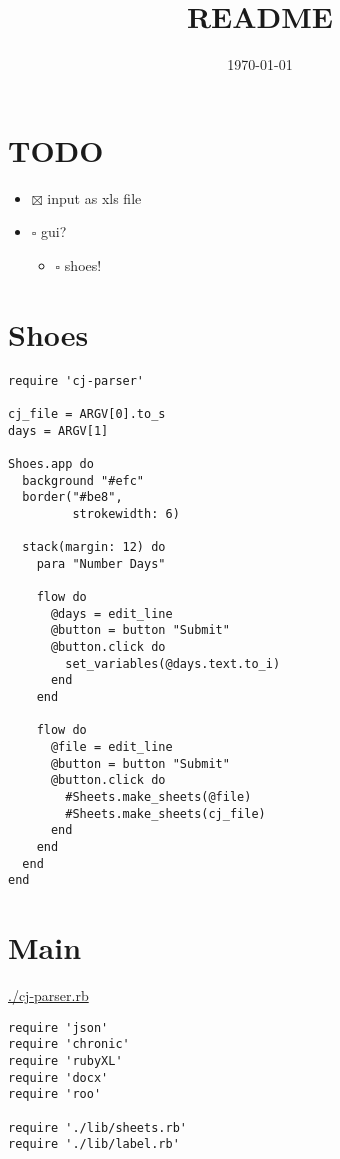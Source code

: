 \documentclass[11pt]{article}
\date{\today}
\title{README}
\begin{document}
\maketitle
\tableofcontents

\section{{\bfseries\sffamily TODO} }
\label{sec-1}

\begin{itemize}
\item $\boxtimes$ input as xls file
\item $\square$ gui?
\begin{itemize}
\item $\square$ shoes!
\end{itemize}
\end{itemize}

\section{Shoes}
\label{sec-2}

\begin{verbatim}
require 'cj-parser'

cj_file = ARGV[0].to_s
days = ARGV[1]

Shoes.app do
  background "#efc"
  border("#be8",
         strokewidth: 6)

  stack(margin: 12) do
    para "Number Days"

    flow do
      @days = edit_line
      @button = button "Submit"
      @button.click do
        set_variables(@days.text.to_i)
      end
    end

    flow do
      @file = edit_line
      @button = button "Submit"
      @button.click do
        #Sheets.make_sheets(@file)    
        #Sheets.make_sheets(cj_file)    
      end
    end
  end
end
\end{verbatim}

\section{Main}
\label{sec-3}

\url{./cj-parser.rb}

\begin{verbatim}
require 'json'
require 'chronic'
require 'rubyXL'
require 'docx'
require 'roo'

require './lib/sheets.rb'
require './lib/label.rb'
\end{verbatim}
\end{document}

